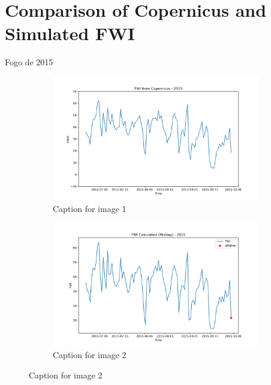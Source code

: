 \section{Comparison of Copernicus and Simulated FWI}
Fogo de 2015
\begin{figure}[h]
\caption{HELLo}
    \centering
    \begin{subfigure}{0.49\textwidth}
        \centering
        \includegraphics[width=\textwidth]{graphs/2015/2015CopernicusFWI12.png}
        \caption{Caption for image 1}
        \label{fig:img1}
    \end{subfigure}
    \hfill
    \begin{subfigure}{0.49\textwidth}
        \centering
        \includegraphics[width=\textwidth]{graphs/2015/2015CalcFWI12.png}
        \caption{Caption for image 2}
        \label{fig:img2}
    \end{subfigure}
    \label{fig:both_images}
\end{figure}

